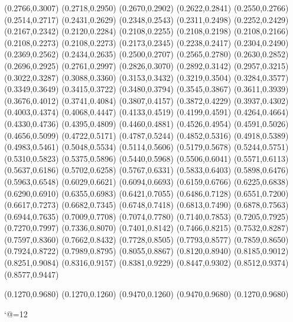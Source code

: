 \PST@Diamond(0.2766,0.3007)
\PST@Diamond(0.2718,0.2950)
\PST@Diamond(0.2670,0.2902)
\PST@Diamond(0.2622,0.2841)
\PST@Diamond(0.2550,0.2766)
\PST@Diamond(0.2514,0.2717)
\PST@Diamond(0.2431,0.2629)
\PST@Diamond(0.2348,0.2543)
\PST@Diamond(0.2311,0.2498)
\PST@Diamond(0.2252,0.2429)
\PST@Diamond(0.2167,0.2342)
\PST@Diamond(0.2120,0.2284)
\PST@Diamond(0.2108,0.2255)
\PST@Diamond(0.2108,0.2198)
\PST@Diamond(0.2108,0.2166)
\PST@Dashed(0.2108,0.2273)
(0.2108,0.2273)
(0.2173,0.2345)
(0.2238,0.2417)
(0.2304,0.2490)
(0.2369,0.2562)
(0.2434,0.2635)
(0.2500,0.2707)
(0.2565,0.2780)
(0.2630,0.2852)
(0.2696,0.2925)
(0.2761,0.2997)
(0.2826,0.3070)
(0.2892,0.3142)
(0.2957,0.3215)
(0.3022,0.3287)
(0.3088,0.3360)
(0.3153,0.3432)
(0.3219,0.3504)
(0.3284,0.3577)
(0.3349,0.3649)
(0.3415,0.3722)
(0.3480,0.3794)
(0.3545,0.3867)
(0.3611,0.3939)
(0.3676,0.4012)
(0.3741,0.4084)
(0.3807,0.4157)
(0.3872,0.4229)
(0.3937,0.4302)
(0.4003,0.4374)
(0.4068,0.4447)
(0.4133,0.4519)
(0.4199,0.4591)
(0.4264,0.4664)
(0.4330,0.4736)
(0.4395,0.4809)
(0.4460,0.4881)
(0.4526,0.4954)
(0.4591,0.5026)
(0.4656,0.5099)
(0.4722,0.5171)
(0.4787,0.5244)
(0.4852,0.5316)
(0.4918,0.5389)
(0.4983,0.5461)
(0.5048,0.5534)
(0.5114,0.5606)
(0.5179,0.5678)
(0.5244,0.5751)
(0.5310,0.5823)
(0.5375,0.5896)
(0.5440,0.5968)
(0.5506,0.6041)
(0.5571,0.6113)
(0.5637,0.6186)
(0.5702,0.6258)
(0.5767,0.6331)
(0.5833,0.6403)
(0.5898,0.6476)
(0.5963,0.6548)
(0.6029,0.6621)
(0.6094,0.6693)
(0.6159,0.6766)
(0.6225,0.6838)
(0.6290,0.6910)
(0.6355,0.6983)
(0.6421,0.7055)
(0.6486,0.7128)
(0.6551,0.7200)
(0.6617,0.7273)
(0.6682,0.7345)
(0.6748,0.7418)
(0.6813,0.7490)
(0.6878,0.7563)
(0.6944,0.7635)
(0.7009,0.7708)
(0.7074,0.7780)
(0.7140,0.7853)
(0.7205,0.7925)
(0.7270,0.7997)
(0.7336,0.8070)
(0.7401,0.8142)
(0.7466,0.8215)
(0.7532,0.8287)
(0.7597,0.8360)
(0.7662,0.8432)
(0.7728,0.8505)
(0.7793,0.8577)
(0.7859,0.8650)
(0.7924,0.8722)
(0.7989,0.8795)
(0.8055,0.8867)
(0.8120,0.8940)
(0.8185,0.9012)
(0.8251,0.9084)
(0.8316,0.9157)
(0.8381,0.9229)
(0.8447,0.9302)
(0.8512,0.9374)
(0.8577,0.9447)

\PST@Border(0.1270,0.9680)
(0.1270,0.1260)
(0.9470,0.1260)
(0.9470,0.9680)
(0.1270,0.9680)

\catcode`@=12
\fi
\endpspicture

